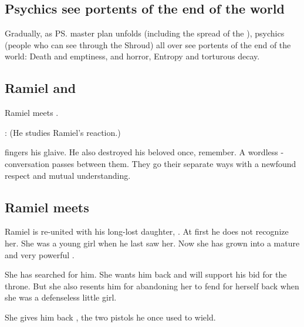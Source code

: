 \subsection{Psychics see portents of the end of the world}
Gradually, as \ps{\Daggerrain}{} master plan unfolds (including the spread of the ), psychics (people who can see through the Shroud) all over \Miith{} see portents of the end of the world: 
Death and emptiness,  and horror, Entropy and torturous decay. 









\subsection{Ramiel and \Ishnaruchaefir}
Ramiel meets \Ishnaruchaefir. 

\begin{prose}
  \Ishnaruchaefir:
  (He studies Ramiel's reaction.)
  
  \Ishnaruchaefir{} fingers his glaive.
  He also destroyed his beloved once, remember. 
  A wordless -conversation passes between them. 
  They go their separate ways with a newfound respect and mutual understanding. 
\end{prose}









\subsection{Ramiel meets \Cishiel}
Ramiel is re-united with his long-lost daughter, . 
At first he does not recognize her. 
She was a young girl when he last saw her.
Now she has grown into a mature and very powerful \resvil. 

She has searched for him. 
She wants him back and will support his bid for the throne. 
But she also resents him for abandoning her to fend for herself back when she was a defenseless little girl. 

She gives him back , the two pistols he once used to wield. 









